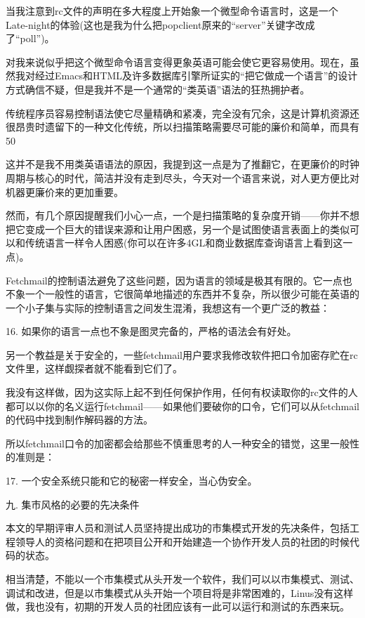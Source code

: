 \documentclass[a4paper,12pt,UTF8,twoside]{ctexbook}
\begin{document}
当我注意到rc文件的声明在多大程度上开始象一个微型命令语言时，这是一个Late-night的体验(这也是我为什么把popclient原来的“server”关键字改成了“poll”)。


对我来说似乎把这个微型命令语言变得更象英语可能会使它更容易使用。现在，虽然我对经过Emacs和HTML及许多数据库引擎所证实的“把它做成一个语言”的设计方式确信不疑，但是我并不是一个通常的“类英语”语法的狂热拥护者。


传统程序员容易控制语法使它尽量精确和紧凑，完全没有冗余，这是计算机资源还很昂贵时遗留下的一种文化传统，所以扫描策略需要尽可能的廉价和简单，而具有50%


这并不是我不用类英语语法的原因，我提到这一点是为了推翻它，在更廉价的时钟周期与核心的时代，简洁并没有走到尽头，今天对一个语言来说，对人更方便比对机器更廉价来的更加重要。


然而，有几个原因提醒我们小心一点，一个是扫描策略的复杂度开销——你并不想把它变成一个巨大的错误来源和让用户困惑，另一个是试图使语言表面上的类似可以和传统语言一样令人困惑(你可以在许多4GL和商业数据库查询语言上看到这一点)。


Fetchmail的控制语法避免了这些问题，因为语言的领域是极其有限的。它一点也不象一个一般性的语言，它很简单地描述的东西并不复杂，所以很少可能在英语的一个小子集与实际的控制语言之间发生混淆，我想这有一个更广泛的教益：


16. 如果你的语言一点也不象是图灵完备的，严格的语法会有好处。


另一个教益是关于安全的，一些fetchmail用户要求我修改软件把口令加密存贮在rc文件里，这样觑探者就不能看到它们了。


我没有这样做，因为这实际上起不到任何保护作用，任何有权读取你的rc文件的人都可以以你的名义运行fetchmail——如果他们要破你的口令，它们可以从fetchmail的代码中找到制作解码器的方法。


所以fetchmail口令的加密都会给那些不慎重思考的人一种安全的错觉，这里一般性的准则是：


17. 一个安全系统只能和它的秘密一样安全，当心伪安全。


九. 集市风格的必要的先决条件


本文的早期评审人员和测试人员坚持提出成功的市集模式开发的先决条件，包括工程领导人的资格问题和在把项目公开和开始建造一个协作开发人员的社团的时候代码的状态。


相当清楚，不能以一个市集模式从头开发一个软件，我们可以以市集模式、测试、调试和改进，但是以市集模式从头开始一个项目将是非常困难的，Linus没有这样做，我也没有，初期的开发人员的社团应该有一此可以运行和测试的东西来玩。
\end{document}
